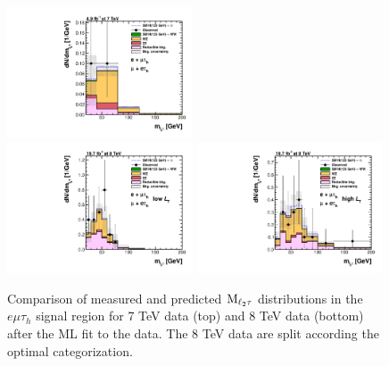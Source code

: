 \begin{figure}
\begin{center}
  \includegraphics[width=0.49\textwidth]{4_Analisys/pics/postfit/emt_postfit_7TeV_FitAllChannels.pdf}\\
  \includegraphics[width=0.49\textwidth]{4_Analisys/pics/postfit/emt_low_postfit_8TeV_FitAllChannels.pdf}
  \includegraphics[width=0.49\textwidth]{4_Analisys/pics/postfit/emt_high_postfit_8TeV_FitAllChannels.pdf}\\
  \caption{Comparison of measured and predicted $\rm{M}_{\ell_2\tau}$ distributions in the $e\mu\tau_h$ signal region for 7 TeV data (top) and 8 TeV data (bottom) after the ML fit to the data. The 8 TeV data are split according the optimal categorization.}
  \label{fig:LLT_emt_postfit}
\end{center}

\end{figure}
